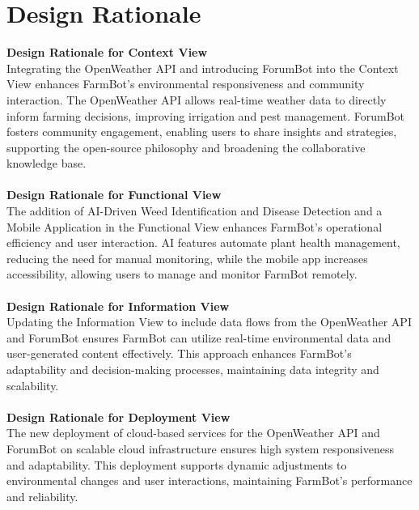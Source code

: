 \section{Design Rationale}
\textbf{Design Rationale for Context View}\\
Integrating the OpenWeather API and introducing ForumBot into the Context View enhances FarmBot's environmental responsiveness and community interaction. The OpenWeather API allows real-time weather data to directly inform farming decisions, improving irrigation and pest management. ForumBot fosters community engagement, enabling users to share insights and strategies, supporting the open-source philosophy and broadening the collaborative knowledge base.\\\\
\textbf{Design Rationale for Functional View}\\
The addition of AI-Driven Weed Identification and Disease Detection and a Mobile Application in the Functional View enhances FarmBot’s operational efficiency and user interaction. AI features automate plant health management, reducing the need for manual monitoring, while the mobile app increases accessibility, allowing users to manage and monitor FarmBot remotely.\\\\
\textbf{Design Rationale for Information View}\\
Updating the Information View to include data flows from the OpenWeather API and ForumBot ensures FarmBot can utilize real-time environmental data and user-generated content effectively. This approach enhances FarmBot’s adaptability and decision-making processes, maintaining data integrity and scalability.\\\\
\textbf{Design Rationale for Deployment View}\\
The new deployment of cloud-based services for the OpenWeather API and ForumBot on scalable cloud infrastructure ensures high system responsiveness and adaptability. This deployment supports dynamic adjustments to environmental changes and user interactions, maintaining FarmBot’s performance and reliability.